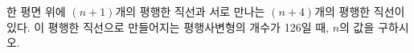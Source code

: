 한 평면 위에 $(n+1)$개의 평행한 직선과 서로 만나는 $(n+4)$개의 평행한 직선이 있다. 이 평행한 직선으로 만들어지는 평행사변형의 개수가 126일 때, $n$의 값을 구하시오.
